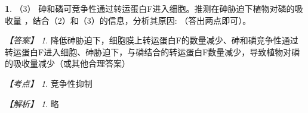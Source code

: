 \documentclass[UTF8, 10pt, a4paper, oneside]{ctexart}
\newcommand{\blank}{ \underbar{\quad$\blacktriangle$\quad} }%
\newcommand{\fs}[1]{{\fangsong #1}}%
\theoremstyle{definition}
\newtheorem{exercise}{}
\theoremstyle{remark}
\newtheorem*{answer}{【答案】}
\newtheorem*{point}{【考点】}      %
\newtheorem*{explanation}{【解析】}     %
\theoremstyle{plain}
\begin{document}
\begin{exercise}
    （3） 砷和磷可竞争性通过转运蛋白F进入细胞。推测在砷胁迫下植物对磷的吸收量 \blank，结合（2）和（3）的信息，分析其原因:\blank（答出两点即可）。

    \begin{answer}
        降低\qquad 砷胁迫下，细胞膜上转运蛋白F的数量减少、砷和磷竞争性通过转运蛋白F进入细胞、砷胁迫下，与磷结合的转运蛋白F数量减少，导致植物对磷的吸收量减少（或其他合理答案）
    \end{answer}
    \begin{point}
        竞争性抑制
    \end{point}
    \begin{explanation}
        \fs{略}
    \end{explanation}

\end{exercise}
\end{document}
